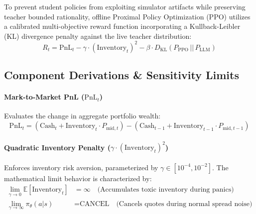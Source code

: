 To prevent student policies from exploiting simulator artifacts while preserving teacher bounded rationality, offline Proximal Policy Optimization (PPO) \cite{schulman2017proximal} utilizes a calibrated multi-objective reward function incorporating a Kullback-Leibler (KL) divergence penalty against the live teacher distribution:
\begin{equation}
    R_t = \text{PnL}_t - \gamma \cdot (\text{Inventory}_t)^2 - \beta \cdot D_{\text{KL}}(P_{\text{PPO}} \,||\, P_{\text{LLM}})
\end{equation}

\subsection{Component Derivations \& Sensitivity Limits}

\paragraph{Mark-to-Market PnL ($\text{PnL}_t$)}
Evaluates the change in aggregate portfolio wealth:
\begin{equation}
    \text{PnL}_t = (\text{Cash}_t + \text{Inventory}_t \cdot P_{\text{mid}, t}) - (\text{Cash}_{t-1} + \text{Inventory}_{t-1} \cdot P_{\text{mid}, t-1})
\end{equation}

\paragraph{Quadratic Inventory Penalty ($\gamma \cdot (\text{Inventory}_t)^2$)}
Enforces inventory risk aversion, parameterized by $\gamma \in [10^{-4}, 10^{-2}]$. The mathematical limit behavior is characterized by:
\begin{align}
    \lim_{\gamma \to 0} \mathbb{E}[\text{Inventory}_t] &= \infty \quad \text{(Accumulates toxic inventory during panics)} \\
    \lim_{\gamma \to \infty} \pi_{\theta}(a|s) &= \text{CANCEL} \quad \text{(Cancels quotes during normal spread noise)}
\end{align}

